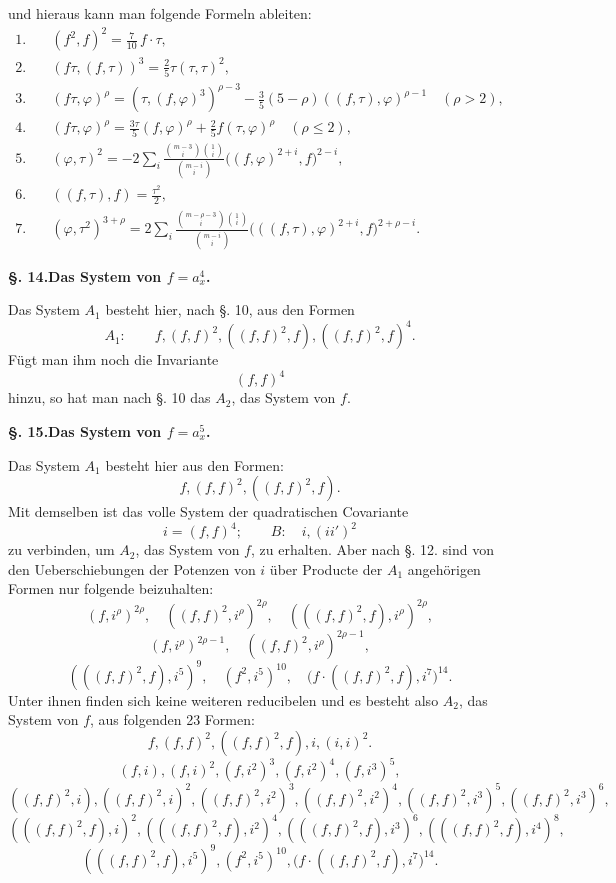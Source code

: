 \documentclass[10pt]{article}
\begin{document}
und hieraus kann man folgende Formeln ableiten:
\begin{align*}
1.\quad &(f^2,f)^2=\frac7{10}\,f\cdot\tau,\\
2.\quad &(f\tau,(f,\tau))^3=\frac25\tau(\tau,\tau)^2,\\
3.\quad &(f\tau,\varphi)^\rho=(\tau,(f,\varphi)^3)^{\rho-3}-\frac35(5-\rho)((f,\tau),\varphi)^{\rho-1}\quad(\rho>2),\\
4.\quad &(f\tau,\varphi)^\rho=\frac{3\tau}{5}(f,\varphi)^\rho+\frac25 f(\tau,\varphi)^\rho\quad(\rho\leq 2),\\
5.\quad &(\varphi,\tau)^2=-2\sum_i\frac{\binom{m-3}{i}\binom{1}{i}}{\binom{m-i}{i}}\bigl((f,\varphi)^{2+i},f\bigr)^{2-i},\\
6.\quad &((f,\tau),f)=\frac{\tau^2}{2},\\
7.\quad &(\varphi,\tau^2)^{3+\rho}=2\sum_i\frac{\binom{m-\rho-3}{i}\binom{1}{i}}{\binom{m-i}{i}}\bigl(((f,\tau),\varphi)^{2+i},f\bigr)^{2+\rho-i}.
\end{align*}

\begin{center}
{\bfseries §. 14.\quad Das System von $f=a_x^4$.}
\end{center}

Das System $A_1$ besteht hier, nach §. 10, aus den Formen
\[
A_1:
\qquad f,(f,f)^2,((f,f)^2,f),((f,f)^2,f)^4.
\]
Fügt man ihm noch die Invariante
\[
(f,f)^4
\]
hinzu, so hat man nach §. 10 das $A_2$, das System von $f$.

\begin{center}
{\bfseries §. 15.\quad Das System von $f=a_x^5$.}
\end{center}

Das System $A_1$ besteht hier aus den Formen:
\[
f,(f,f)^2,((f,f)^2,f).
\]
Mit demselben ist das volle System der quadratischen Covariante
\[
i=(f,f)^4;
\qquad
B:
\quad i,(ii')^2
\]
zu verbinden, um $A_2$, das System von $f$, zu erhalten. Aber nach §. 12. sind von den Ueberschiebungen der Potenzen von $i$ über Producte der $A_1$ angehörigen Formen nur folgende beizuhalten:
\[
(f,i^\rho)^{2\rho},\quad ((f,f)^2,i^\rho)^{2\rho},\quad (((f,f)^2,f),i^\rho)^{2\rho},
\]
\[
(f,i^\rho)^{2\rho-1},\quad ((f,f)^2,i^\rho)^{2\rho-1},
\]
\[
(((f,f)^2,f),i^5)^9,
\quad (f^2,i^5)^{10},
\quad \bigl(f\cdot((f,f)^2,f),i^7\bigr)^{14}.
\]
Unter ihnen finden sich keine weiteren reducibelen und es besteht also $A_2$, das System von $f$, aus folgenden 23 Formen:
\[
f,(f,f)^2,((f,f)^2,f),i,(i,i)^2.
\]
\[
(f,i),(f,i)^2,(f,i^2)^3,(f,i^2)^4,(f,i^3)^5,
\]
\[
((f,f)^2,i),((f,f)^2,i)^2,((f,f)^2,i^2)^3,((f,f)^2,i^2)^4,((f,f)^2,i^3)^5,((f,f)^2,i^3)^6,
\]
\[
(((f,f)^2,f),i)^2,(((f,f)^2,f),i^2)^4,(((f,f)^2,f),i^3)^6,(((f,f)^2,f),i^4)^8,
\]
\[
(((f,f)^2,f),i^5)^9,(f^2,i^5)^{10},\bigl(f\cdot((f,f)^2,f),i^7\bigr)^{14}.
\]
\end{document}
